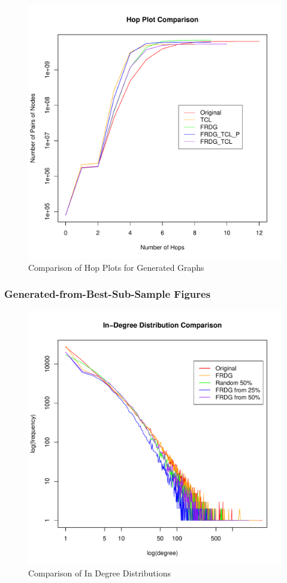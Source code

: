 \documentclass[pdftex,11pt,a4paper,twocolumn]{scrartcl}
\begin{document}
\begin{figure}[h!]
\centering
\includegraphics[width=\columnwidth]{generatedComparison_hop.pdf} 
\caption{Comparison of Hop Plots for Generated Graphs \label{fig:genHop}}
\end{figure}

\pagebreak

\subsubsection{Generated-from-Best-Sub-Sample Figures}
\label{sec:bestsFigures}

\begin{figure}[h!]
\centering
\includegraphics[width=\columnwidth]{bestsComparison_inDeg.pdf} 
\caption{Comparison of In Degree Distributions \label{fig:bestInDeg}}
\end{figure}
\end{document}
